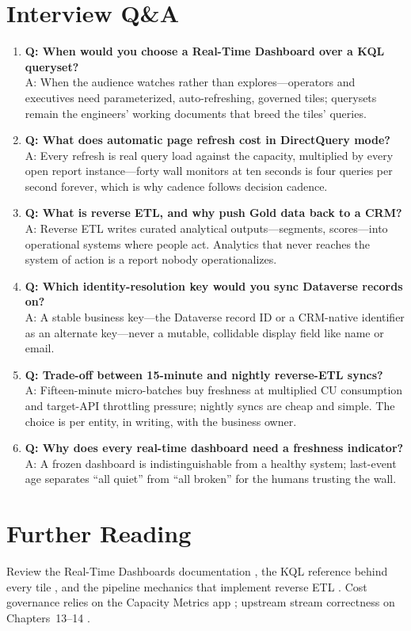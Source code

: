 \section{Interview Q\&A}
\begin{enumerate}
    \item \textbf{Q: When would you choose a Real-Time Dashboard over a KQL queryset?}\\
    A: When the audience watches rather than explores---operators and executives need parameterized, auto-refreshing, governed tiles; querysets remain the engineers' working documents that breed the tiles' queries.
    \item \textbf{Q: What does automatic page refresh cost in DirectQuery mode?}\\
    A: Every refresh is real query load against the capacity, multiplied by every open report instance---forty wall monitors at ten seconds is four queries per second forever, which is why cadence follows decision cadence.
    \item \textbf{Q: What is reverse ETL, and why push Gold data back to a CRM?}\\
    A: Reverse ETL writes curated analytical outputs---segments, scores---into operational systems where people act. Analytics that never reaches the system of action is a report nobody operationalizes.
    \item \textbf{Q: Which identity-resolution key would you sync Dataverse records on?}\\
    A: A stable business key---the Dataverse record ID or a CRM-native identifier as an alternate key---never a mutable, collidable display field like name or email.
    \item \textbf{Q: Trade-off between 15-minute and nightly reverse-ETL syncs?}\\
    A: Fifteen-minute micro-batches buy freshness at multiplied CU consumption and target-API throttling pressure; nightly syncs are cheap and simple. The choice is per entity, in writing, with the business owner.
    \item \textbf{Q: Why does every real-time dashboard need a freshness indicator?}\\
    A: A frozen dashboard is indistinguishable from a healthy system; last-event age separates ``all quiet'' from ``all broken'' for the humans trusting the wall.
\end{enumerate}

\section{Further Reading}
Review the Real-Time Dashboards documentation \cite{microsoftRealTimeDashboards}, the KQL reference behind every tile \cite{microsoftKQL}, and the pipeline mechanics that implement reverse ETL \cite{microsoftFabricPipelines}. Cost governance relies on the Capacity Metrics app \cite{microsoftFabricMetricsApp}; upstream stream correctness on Chapters~13--14 \cite{microsoftFabricEventstreams,microsoftFabricEventhouse}.

